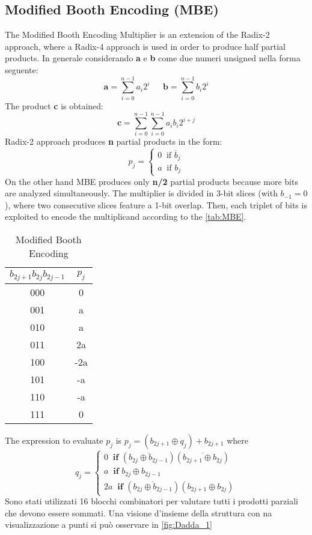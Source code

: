 \subsection{Modified Booth Encoding (MBE)}
The Modified Booth Encoding Multiplier is an extension of the Radix-2 approach, where a Radix-4 approach is used in order to produce half partial products. In generale considerando \textbf{a} e \textbf{b} come due numeri unsigned nella forma seguente:
$$
\textbf{a} = \sum_{i=0}^{n-1}a_i2^i\ \ \ \ \ \ \  \textbf{b} = \sum_{i=0}^{n-1}b_i2^i
$$
The product \textbf{c} is obtained:
$$
\textbf{c} = \sum_{i=0}^{n-1}\sum_{i=0}^{n-1}a_ib_i2^{i+j}
$$
Radix-2 approach produces \textbf{n} partial products in the form:
$$
p_j =
\begin{cases}
0 \ \textrm{  if   } \overline{b}_j\\
a \ \textrm{  if   } {b}_j
\end{cases}
$$
On the other hand MBE produces only \textbf{n/2} partial products because more bits are analyzed simultaneously. The multiplier is divided in 3-bit slices (with $b_{-1} = 0$), where two consecutive slices feature a 1-bit overlap. Then, each triplet of bits is exploited to encode the multiplicand according to the \autoref{tab:MBE}.

\begin{table}[htb]
	\centering
	\begin{tabular}{cc}
		$b_{2j+1}b_{2j}b_{2j-1}$ & $p_j$ \\
		\hline
		000 & 0 \\
		001 & a \\
		010 & a \\
		011 & 2a \\
		100 & -2a \\
		101 & -a \\
		110 & -a \\
		111 & 0 \\
	\end{tabular}
	\label{tab:MBE}
	\caption{Modified Booth Encoding}
\end{table}
The expression to evaluate $p_j$ is $p_j = (b_{2j+1} \oplus q_j) + b_{2j+1}$ where
$$ q_j=
\begin{cases}
0 \ \textbf{  if   } (\overline{b_{2j} \oplus b_{2j-1}})(\overline{b_{2j+1} \oplus b_{2j}})\\
a \ \textbf{  if   } b_{2j} \oplus b_{2j-1}\\
2a \ \textbf{  if   } (\overline{b_{2j} \oplus b_{2j-1}})(b_{2j+1} \oplus b_{2j})
\end{cases}
$$
Sono stati utilizzati 16 blocchi combinatori per valutare tutti i prodotti parziali che devono essere sommati. Una visione d'insieme della struttura con na visualizzazione a punti si può osservare in \autoref{fig:Dadda_1}

